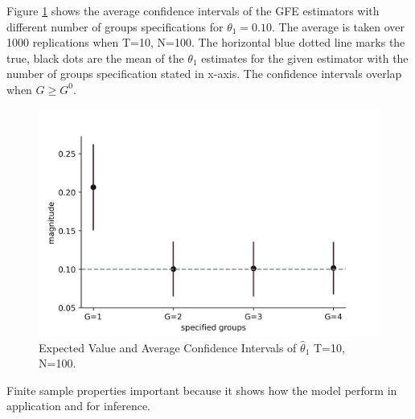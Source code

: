 Figure \ref{fig:cilength} shows the average confidence intervals of the GFE estimators with different number of groups specifications for $\theta_1 = 0.10$. The average is taken over 1000 replications when T=10, N=100. The horizontal blue dotted line marks the true, black dots are the mean of the $\theta_1$ estimates for the given estimator with the number of groups specification stated in x-axis. The confidence intervals overlap when $G \geq G^0$. 
\begin{figure}[h]
\centering
\includegraphics[scale=0.85]{figures/ciplot.png}
\caption{Expected Value and Average Confidence Intervals of $\hat{\theta}_1$ T=10, N=100.}
\label{fig:cilength}
\end{figure}
 
Finite sample properties important because it shows how the model perform in application and for inference. 



